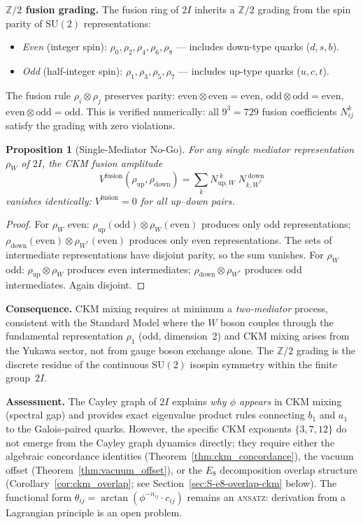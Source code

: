 \documentclass[12pt,a4paper]{article}
\newtheorem{proposition}{Proposition}
\theoremstyle{definition}
\begin{document}
\textbf{$\mathbb{Z}/2$ fusion grading.}  The fusion ring of $2I$ inherits a $\mathbb{Z}/2$ grading from the spin parity of $\mathrm{SU}(2)$ representations:
\begin{itemize}
\item \emph{Even} (integer spin): $\rho_0, \rho_2, \rho_4, \rho_6, \rho_8$ --- includes down-type quarks ($d, s, b$).
\item \emph{Odd} (half-integer spin): $\rho_1, \rho_3, \rho_5, \rho_7$ --- includes up-type quarks ($u, c, t$).
\end{itemize}
The fusion rule $\rho_i \otimes \rho_j$ preserves parity: $\mathrm{even} \otimes \mathrm{even} = \mathrm{even}$, $\mathrm{odd} \otimes \mathrm{odd} = \mathrm{even}$, $\mathrm{even} \otimes \mathrm{odd} = \mathrm{odd}$.  This is verified numerically: all $9^3 = 729$ fusion coefficients $N_{ij}^k$ satisfy the grading with zero violations.

\begin{proposition}[Single-Mediator No-Go]
\label{prop:ckm_nogo}
For any single mediator representation $\rho_W$ of $2I$, the CKM fusion amplitude
\[
V^{\text{fusion}}(\rho_{\text{up}}, \rho_{\text{down}}) = \sum_k N_{\text{up},W}^{\;k}\; N_{k,W^*}^{\;\text{down}}
\]
vanishes identically: $V^{\text{fusion}} = 0$ for all up--down pairs.
\end{proposition}
\begin{proof}
For $\rho_W$ even: $\rho_{\text{up}}(\text{odd}) \otimes \rho_W(\text{even})$ produces only odd representations; $\rho_{\text{down}}(\text{even}) \otimes \rho_{W^*}(\text{even})$ produces only even representations.  The sets of intermediate representations have disjoint parity, so the sum vanishes.  For $\rho_W$ odd: $\rho_{\text{up}} \otimes \rho_W$ produces even intermediates; $\rho_{\text{down}} \otimes \rho_{W^*}$ produces odd intermediates.  Again disjoint.
\end{proof}

\textbf{Consequence.}  CKM mixing requires at minimum a \emph{two-mediator} process, consistent with the Standard Model where the $W$ boson couples through the fundamental representation $\rho_1$ (odd, dimension~2) and CKM mixing arises from the Yukawa sector, not from gauge boson exchange alone.  The $\mathbb{Z}/2$ grading is the discrete residue of the continuous $\mathrm{SU}(2)$ isospin symmetry within the finite group~$2I$.

\textbf{Assessment.}  The Cayley graph of $2I$ explains \emph{why $\phi$ appears} in CKM mixing (spectral gap) and provides exact eigenvalue product rules connecting $b_1$ and $a_1$ to the Galois-paired quarks.  However, the specific CKM exponents $\{3, 7, 12\}$ do not emerge from the Cayley graph dynamics directly; they require either the algebraic concordance identities (Theorem~\ref{thm:ckm_concordance}), the vacuum offset (Theorem~\ref{thm:vacuum_offset}), or the $E_8$ decomposition overlap structure (Corollary~\ref{cor:ckm_overlap}; see Section~\ref{sec:S-e8-overlap-ckm} below).  The functional form $\theta_{ij} = \arctan(\phi^{-n_{ij}} \cdot c_{ij})$ remains an \textsc{ansatz}: derivation from a Lagrangian principle is an open problem.
\end{document}
